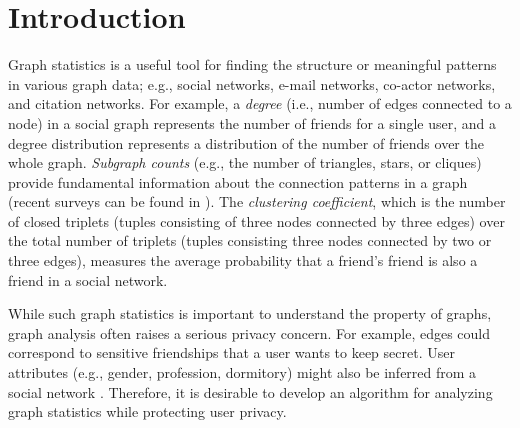 \section{Introduction}
\label{chap1-sec:intro}
Graph statistics is a useful tool for finding the structure or meaningful patterns in various graph data; e.g., social networks, e-mail networks, co-actor networks, and citation networks. 
For example, 
a \textit{degree} (i.e., number of edges connected to a node) in a social graph represents the number of friends for a single user, and a degree distribution represents a distribution of the number of friends over the whole graph. 
\textit{Subgraph counts} 
(e.g., the number of triangles, stars, or cliques) provide fundamental information about the connection patterns in a graph (recent surveys can be found in \cite{Ribeiro_arXiv19}). 
The \textit{clustering coefficient}, which is the number of closed triplets (tuples consisting of three nodes connected by three edges)
over the total number of 
triplets (tuples consisting three nodes connected by two or three edges), 
measures the average probability that a friend's friend is also a friend in a social network. 

While such graph statistics is important to understand the property of graphs, 
graph analysis often raises a serious privacy concern. 
For example, 
edges could correspond to sensitive friendships 
that a user wants to keep secret. 
User attributes (e.g.,  gender, profession, dormitory) might also be inferred from a social network \cite{Dougnon_AI15,Mislove_WSDM10}.
Therefore, it is desirable to develop an algorithm for analyzing graph statistics while protecting user privacy.

